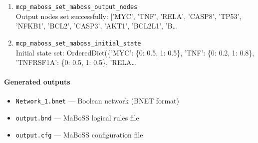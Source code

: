 \begin{enumerate}
\hfill\\
\RaggedRight MYC
\item[29.] \texttt{mcp\_\allowbreak{}maboss\_\allowbreak{}set\_\allowbreak{}maboss\_\allowbreak{}output\_\allowbreak{}nodes}
\hfill\\
\RaggedRight Output nodes set successfully: ['MYC', 'TNF', 'RELA', 'CASP8', 'TP53', 'NFKB1', 'BCL2', 'CASP3', 'AKT1', 'BCL2L1', 'B\ldots{}
\item[30.] \texttt{mcp\_\allowbreak{}maboss\_\allowbreak{}set\_\allowbreak{}maboss\_\allowbreak{}initial\_\allowbreak{}state}
\hfill\\
\RaggedRight Initial state set: OrderedDict(\{'MYC': \{0: 0.5, 1: 0.5\}, 'TNF': \{0: 0.2, 1: 0.8\}, 'TNFRSF1A': \{0: 0.5, 1: 0.5\}, 'RELA\ldots{}
\end{enumerate}
\endgroup

\paragraph{Generated outputs}
\begin{itemize}
\item \texttt{Network\_\allowbreak{}1.\allowbreak{}bnet} — Boolean network (BNET format)
\item \texttt{output.\allowbreak{}bnd} — MaBoSS logical rules file
\item \texttt{output.\allowbreak{}cfg} — MaBoSS configuration file
\end{itemize}
